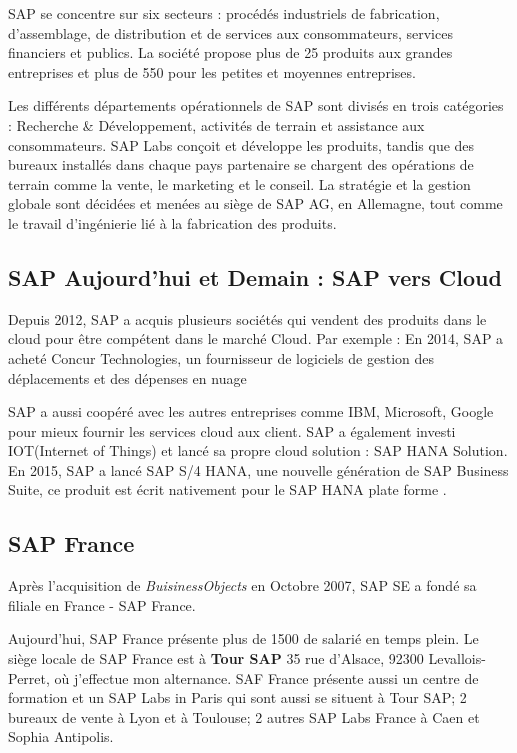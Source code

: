 SAP se concentre sur six secteurs : procédés industriels de fabrication, d’assemblage, de distribution et de services aux consommateurs, services financiers et publics. La société propose plus de 25 produits aux grandes entreprises et plus de 550 pour les petites et moyennes entreprises.

Les différents départements opérationnels de SAP sont divisés en trois catégories : Recherche \& Développement, activités de terrain et assistance aux consommateurs. SAP Labs conçoit et développe les produits, tandis que des bureaux installés dans chaque pays partenaire se chargent des opérations de terrain comme la vente, le marketing et le conseil. La stratégie et la gestion globale sont décidées et menées au siège de SAP AG, en Allemagne, tout comme le travail d’ingénierie lié à la fabrication des produits.

\subsection{SAP Aujourd'hui et Demain : SAP vers Cloud}
Depuis 2012, SAP a acquis plusieurs sociétés qui vendent des produits dans le cloud pour être compétent dans le marché Cloud. Par exemple : En 2014, SAP a acheté Concur Technologies, un fournisseur de logiciels de gestion des déplacements et des dépenses en nuage

\par SAP a aussi coopéré avec les autres entreprises comme IBM, Microsoft, Google pour mieux fournir les services cloud aux client. SAP a également investi IOT(Internet of Things) et lancé sa propre cloud solution : SAP HANA Solution. En 2015, SAP a lancé SAP S/4 HANA, une nouvelle génération de SAP Business Suite, ce produit est écrit nativement pour le SAP HANA plate forme .

\subsection{SAP France}
    Après l'acquisition de \textit{BuisinessObjects} en Octobre 2007, SAP SE a fondé sa filiale en France - SAP France. 
    \par Aujourd'hui, SAP France présente plus de 1500 de salarié en temps plein. Le siège locale de SAP France est à \textbf{Tour SAP} 35 rue d'Alsace, 92300 Levallois-Perret, où j'effectue mon alternance. SAF France présente aussi un centre de formation et un SAP Labs in Paris qui sont aussi se situent à Tour SAP; 2 bureaux de vente à Lyon et à Toulouse; 2 autres SAP Labs France à Caen et Sophia Antipolis.
    

